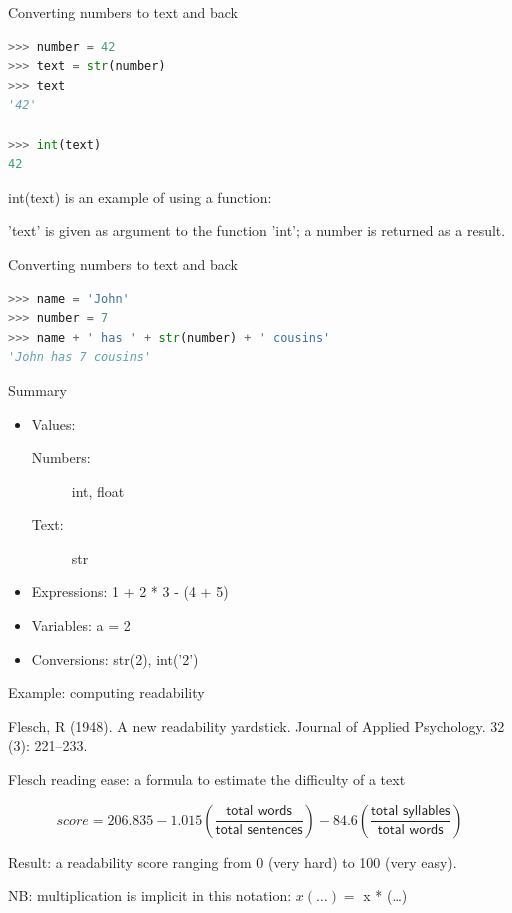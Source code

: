 \documentclass[aspectratio=169,usenames,dvipsnames]{beamer}
\begin{document}
\begin{frame}[fragile]{Converting numbers to text and back}
\begin{lstlisting}[language=python]
>>> number = 42
>>> text = str(number)
>>> text
'42'

>>> int(text)
42
\end{lstlisting}

    int(text) is an example of using a function:

    'text' is given as argument to the function 'int';
    a number is returned as a result.
\end{frame}


\begin{frame}[fragile]{Converting numbers to text and back}
\begin{lstlisting}[language=python]
>>> name = 'John'
>>> number = 7
>>> name + ' has ' + str(number) + ' cousins'
'John has 7 cousins'
\end{lstlisting}
\end{frame}

\begin{frame}{Summary}
    \begin{itemize}
        \item Values:
            \begin{description}
                \item[Numbers:] int, float
                \item[Text:] str
            \end{description}
        \item Expressions: 1 + 2 * 3 - (4 + 5)
        \item Variables: a = 2
        \item Conversions: str(2), int('2')
    \end{itemize}
\end{frame}

\begin{frame}{Example: computing readability}
	\begin{reference}
    Flesch, R (1948). A new readability yardstick.
		Journal of Applied Psychology. 32 (3): 221--233.
	\end{reference}

    Flesch reading ease: a formula to estimate the difficulty of a text

    \[
        score = 206.835 - 1.015 ( \frac{\textsf{total words}}{\textsf{total sentences}} )
            - 84.6 ( \frac{\textsf{total syllables}}{\textsf{total words}} )
    \]

    Result: a readability score ranging from 0 (very hard) to 100 (very easy).

    \pause
    \vspace{1em}
	NB: multiplication is implicit in this notation: $ x(\dots) = $ x * (\dots)
\end{frame}
\end{document}
